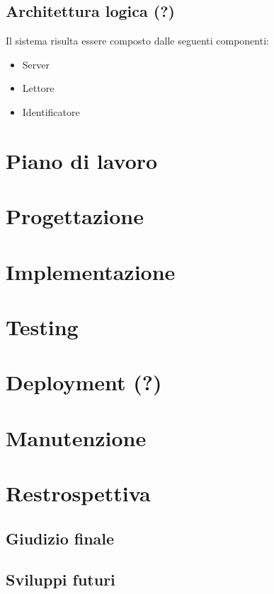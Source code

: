 \documentclass[a4paper,12pt]{report}
\begin{document}
\section{Architettura logica (?)}
Il sistema risulta essere composto dalle seguenti componenti:
\begin{itemize}
	\item Server
	\item Lettore
	\item Identificatore
\end{itemize}

\chapter{Piano di lavoro}

\chapter{Progettazione}

\chapter{Implementazione}

\chapter{Testing} 

\chapter{Deployment (?)}

\chapter{Manutenzione}

\chapter{Restrospettiva}
\section{Giudizio finale}
\section{Sviluppi futuri}

 
\end{document}
